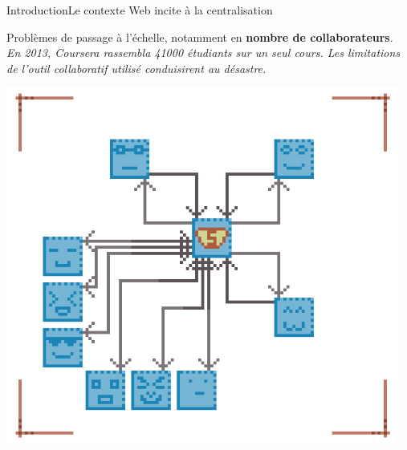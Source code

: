 \begin{frame}{Introduction}{Le contexte Web incite à la centralisation}
  \begin{minipage}{0.69\textwidth}
    Problèmes de passage à l'échelle, notamment en \textbf{nombre de
      collaborateurs}. \vspace{0.15cm}\\
    \small\textit{En 2013, Coursera rassembla 41000 étudiants sur un seul cours.  Les
      limitations de l'outil collaboratif utilisé conduisirent au \og
      désastre\fg.}%
  \end{minipage}
  \hfill
  \begin{minipage}{0.3\textwidth}
    \hfill
    \includegraphics[width=0.97\textwidth]{img/centralizedcpuproblems.png}
  \end{minipage}


\end{frame}
